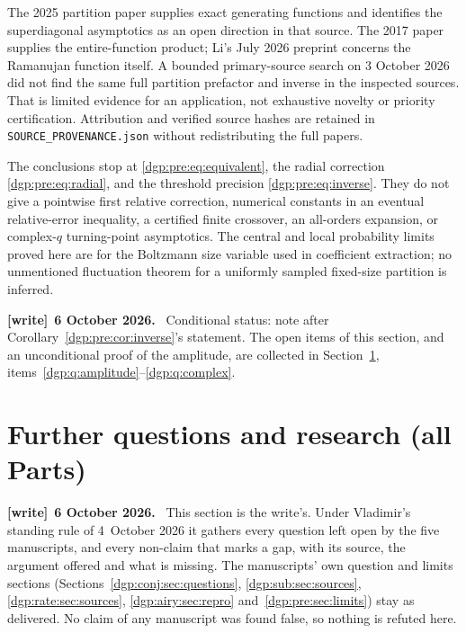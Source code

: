 \documentclass[11pt,letterpaper]{article}
\numberwithin{equation}{section}
\theoremstyle{remark}\newtheorem{remark}[theorem]{Remark}
\newenvironment{writenote}[1][]{\par\smallskip\begingroup\small
 \noindent\textbf{[write]}\if\relax\detokenize{#1}\relax\else~\textbf{#1.}\fi\ }%
 {\par\endgroup\smallskip}
\begin{document}
The 2025 partition paper supplies exact generating functions and
identifies the superdiagonal asymptotics as an open direction in that
source. The 2017 paper supplies the entire-function product; Li's
July 2026 preprint concerns the Ramanujan function itself. A bounded
primary-source search on 3 October 2026 did not find the same full
partition prefactor and inverse in the inspected sources. That is
limited evidence for an application, not exhaustive novelty or priority
certification. Attribution and verified source hashes are retained in
\texttt{SOURCE\_PROVENANCE.json} without redistributing the full papers.

The conclusions stop at \eqref{dgp:pre:eq:equivalent}, the radial correction
\eqref{dgp:pre:eq:radial}, and the threshold precision \eqref{dgp:pre:eq:inverse}.
They do not give a pointwise first relative correction, numerical
constants in an eventual relative-error inequality, a certified finite
crossover, an all-orders expansion, or complex-$q$ turning-point
asymptotics. The central and local probability limits proved here are
for the Boltzmann size variable used in coefficient extraction; no
unmentioned fluctuation theorem for a uniformly sampled fixed-size
partition is inferred.
\begin{writenote}[6 October 2026]
Conditional status: note after Corollary~\ref{dgp:pre:cor:inverse}'s statement. The open items of this section, and an unconditional proof of the amplitude, are collected in Section~\ref{dgp:sec:further}, items~\ref{dgp:q:amplitude}--\ref{dgp:q:complex}.
\end{writenote}

\clearpage
\section{Further questions and research (all Parts)}\label{dgp:sec:further}
\begin{writenote}[6 October 2026]
This section is the write's. Under Vladimir's standing rule of 4~October 2026 it gathers every question left open by the five manuscripts, and every non-claim that marks a gap, with its source, the argument offered and what is missing. The manuscripts' own question and limits sections (Sections~\ref{dgp:conj:sec:questions}, \ref{dgp:sub:sec:sources}, \ref{dgp:rate:sec:sources}, \ref{dgp:airy:sec:repro} and~\ref{dgp:pre:sec:limits}) stay as delivered. No claim of any manuscript was found false, so nothing is refuted here.
\end{writenote}
\end{document}
